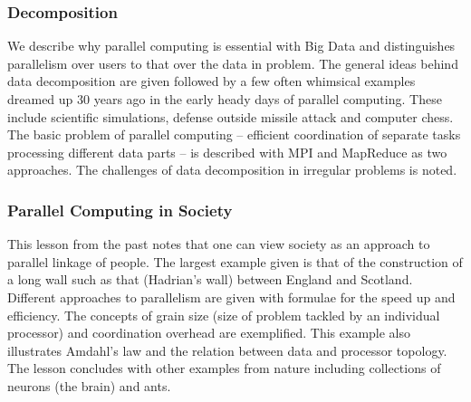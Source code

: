 
\subsubsection{Decomposition}\label{decomposition}

We describe why parallel computing is essential with Big Data and
distinguishes parallelism over users to that over the data in problem.
The general ideas behind data decomposition are given followed by a few
often whimsical examples dreamed up 30 years ago in the early heady days
of parallel computing. These include scientific simulations, defense
outside missile attack and computer chess. The basic problem of parallel
computing -- efficient coordination of separate tasks processing
different data parts -- is described with MPI and MapReduce as two
approaches. The challenges of data decomposition in irregular problems
is noted.




\subsubsection{Parallel Computing in Society}

This lesson from the past notes that one can view society as an approach
to parallel linkage of people. The largest example given is that of the
construction of a long wall such as that (Hadrian's wall) between
England and Scotland. Different approaches to parallelism are given with
formulae for the speed up and efficiency. The concepts of grain size
(size of problem tackled by an individual processor) and coordination
overhead are exemplified. This example also illustrates Amdahl's law and
the relation between data and processor topology. The lesson concludes
with other examples from nature including collections of neurons (the
brain) and ants.


